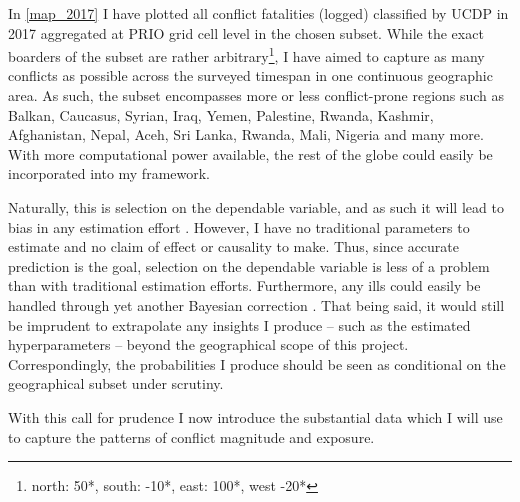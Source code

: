 \documentclass[a4paper]{article}
\begin{document}
In \autoref{map_2017} I have plotted all conflict fatalities (logged) classified by UCDP in 2017 aggregated at PRIO grid cell level in the chosen subset. While the exact boarders of the subset are rather arbitrary\footnote{north: 50*, south: -10*, east: 100*, west -20*}, I have aimed to capture as many conflicts as possible across the surveyed timespan in one continuous geographic area. As such, the subset encompasses more or less conflict-prone regions such as Balkan, Caucasus, Syrian, Iraq, Yemen, Palestine, Rwanda, Kashmir, Afghanistan, Nepal, Aceh, Sri Lanka, Rwanda, Mali, Nigeria and many more. With more computational power available, the rest of the globe could easily be incorporated into my framework.\par

Naturally, this is selection on the dependable variable, and as such it will lead to bias in any estimation effort \citep[129-130]{king1994designing}. However, I have no traditional parameters to estimate and no claim of effect or causality to make. Thus, since accurate prediction is the goal, selection on the dependable variable is less of a problem than with traditional estimation efforts. Furthermore, any ills could easily be handled through yet another Bayesian correction \citep[627-628]{King_Zeng_2001}. That being said, it would still be imprudent to extrapolate any insights I produce -- such as the estimated hyperparameters -- beyond the geographical scope of this project. Correspondingly, the probabilities I produce should be seen as conditional on the geographical subset under scrutiny.\par



With this call for prudence I now introduce the substantial data which I will use to capture the patterns of conflict magnitude and exposure.\par
\end{document}
